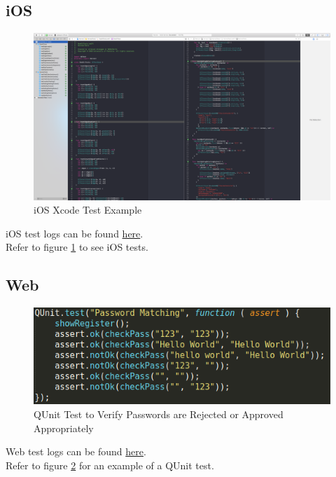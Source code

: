 \documentclass[12pt]{article}
\begin{document}
\subsection{iOS}
	\begin{figure}
  	\includegraphics[width=\textwidth]{images/iosexample.png}
	\caption{iOS Xcode Test Example}
	\label{fig:ie}
  \end{figure}
iOS test logs can be found \href{https://github.com/BinaryNinjaz/COS301-Capstone/tree/master/Source/iOS/Harvest/TestResults}{here}.\\
\indent Refer to figure \ref{fig:ie} to see iOS tests.
\subsection{Web}
	\begin{figure}
  	\includegraphics[width=\textwidth]{images/qt.png}
	\caption{QUnit Test to Verify Passwords are Rejected or Approved Appropriately}
	\label{fig:qt}
  \end{figure}
Web test logs can be found \href{https://github.com/BinaryNinjaz/COS301-Capstone/tree/master/Source/Web/test-logs}{here}.\\
\indent Refer to figure \ref{fig:qt} for an example of a QUnit test.
\end{document}
